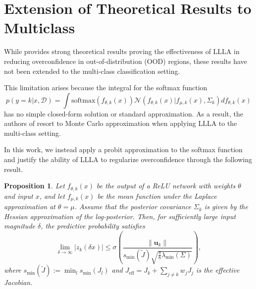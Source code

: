 \documentclass{article}
\newtheorem{proposition}{Proposition}
\begin{document}
\section{Extension of Theoretical Results to Multiclass}
While \cite{main_paper} provides strong theoretical results proving the effectiveness of LLLA in reducing overconfidence in out-of-distribution (OOD) regions, these results have not been extended to the multi-class classification setting.

This limitation arises because the integral for the softmax function
\begin{equation}
\label{softmax_integration}
    p(y=k | x, \mathcal{D}) = \int \text{softmax}(f_{\theta, k}(x)) 
    \mathcal{N}(f_{\theta, k}(x) | f_{\mu, k}(x), \Sigma_k) df_{\theta, k}(x)
\end{equation}
has no simple closed-form solution or standard approximation. As a result, the authors of \cite{main_paper} resort to Monte Carlo approximation when applying LLLA to the multi-class setting.

In this work, we instead apply a probit approximation to the softmax function and justify the ability of LLLA to regularize overconfidence through the following result.

\begin{proposition}
Let \( f_{\theta,k}(x) \) be the output of a ReLU network with weights \( \theta \) and input \( x \), and let \( f_{\mu,k}(x) \) be the mean function under the Laplace approximation at \( \theta = \mu \). Assume that the posterior covariance \( \Sigma_k \) is given by the Hessian approximation of the log-posterior. Then, for sufficiently large input magnitude \( \delta \), the predictive probability satisfies
\begin{equation}
    \lim_{\delta\to \infty} \lvert z_k(\delta x)\rvert \leq 
    \sigma \left(\frac{\lVert\mathbf{u}_k\rVert}{s_{\min}(\tilde{J})\sqrt{\frac{\pi}{8}\lambda_{\min}(\Sigma)}}\right),
\end{equation}
where \( s_{\min}(\tilde{J}) := \min_{l} s_{\min}(J_{l}) \) and \( J_{\text{eff}} = J_k + \sum_{j \neq k} w_j J_j \) is the effective Jacobian.
\end{proposition}
\end{document}
